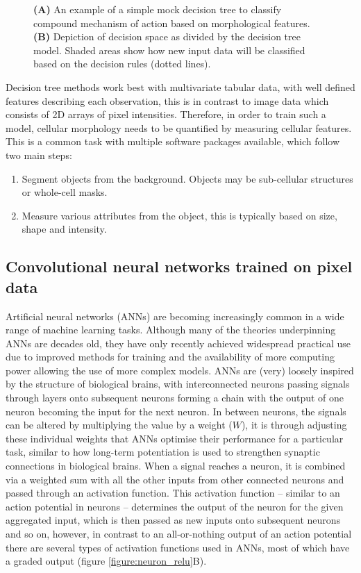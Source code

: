 \documentclass[a4paper,11pt,twoside,openright]{scrbook}
\begin{document}
\begin{figure}
    \captionsetup{width=0.8\textwidth}
    \caption[Diagram of a simple decision tree]{\textbf{(A)} An example of a simple mock decision tree to classify 
compound mechanism of action based on morphological features. \textbf{(B)} Depiction of decision space as divided by 
the decision tree model. Shaded areas show how new input data will be classified based on the decision rules (dotted 
lines).}
    
    \label{figure:decision_tree}
\end{figure}

Decision tree methods work best with multivariate tabular data, with well defined features describing each observation, 
this is in contrast to image data which consists of 2D arrays of pixel intensities.
Therefore, in order to train such a model, cellular morphology needs to be quantified by measuring cellular features.
This is a common task with multiple software packages available, which follow two main steps:
\begin{enumerate}
    \item Segment objects from the background. Objects may be sub-cellular structures or whole-cell masks.
    \item Measure various attributes from the object, this is typically based on size, shape and intensity.
\end{enumerate}


\subsection{Convolutional neural networks trained on pixel data}

Artificial neural networks (ANNs) are becoming increasingly common in a wide range of machine learning tasks.
Although many of the theories underpinning ANNs are decades old, \cite{Rosenblatt1958} they have only recently achieved 
widespread practical use due to improved methods for training \cite{Rumelhart1986} and the availability of more 
computing power allowing the use of more complex models.
ANNs are (very) loosely inspired by the structure of biological brains, with interconnected neurons passing signals 
through layers onto subsequent neurons forming a chain with the output of one neuron becoming the input for the next 
neuron.
In between neurons, the signals can be altered by multiplying the value by a weight ($W$), it is through adjusting 
these individual weights that ANNs optimise their performance for a particular task, similar to how long-term 
potentiation is used to strengthen synaptic connections in biological brains.
When a signal reaches a neuron, it is combined via a weighted sum with all the other inputs from other connected 
neurons and passed through an activation function.
This activation function -- similar to an action potential in neurons -- determines the output of the neuron for the 
given aggregated input, which is then passed as new inputs onto subsequent neurons and so on, however, in contrast to 
an all-or-nothing output of an action potential there are several types of activation functions used in ANNs, most of 
which have a graded output (figure \ref{figure:neuron_relu}B).
\end{document}
